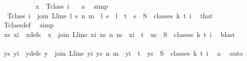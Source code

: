 \begin{isabellebody}
\ \ \ \ \ \ \isamarkupfalse%
\ \isamarkupfalse%
\ \ {\isachardoublequoteopen}x\ {\isasymin}\ T{\isacharunderscore}{\kern0pt}class\ i\ {\isachardoublequoteclose}\ \isamarkupfalse%
\ a\ \isamarkupfalse%
\ simp\isanewline
\ \ \ \ \ \ \isamarkupfalse%
\ \isamarkupfalse%
\ {\isacharasterisk}{\kern0pt}{\isacharasterisk}{\kern0pt}{\isacharcolon}{\kern0pt}\ {\isachardoublequoteopen}T{\isacharunderscore}{\kern0pt}class\ i\ {\isacharequal}{\kern0pt}\ {\isacharbraceleft}{\kern0pt}join\ {\isacharparenleft}{\kern0pt}L{\isacharunderscore}{\kern0pt}line\ l{\isacharparenright}{\kern0pt}\ s\ n\ m\ {\isacharbar}{\kern0pt}\ l\ s\ {\isachardot}{\kern0pt}\ l\ {\isasymin}\ {\isacharbraceleft}{\kern0pt}{\isachardot}{\kern0pt}{\isachardot}{\kern0pt}{\isacharless}{\kern0pt}t{\isacharbraceright}{\kern0pt}\ {\isasymand}\ s\ {\isasymin}\ S\ {\isacharbackquote}{\kern0pt}\ {\isacharparenleft}{\kern0pt}classes\ k\ t\ i{\isacharparenright}{\kern0pt}{\isacharbraceright}{\kern0pt}{\isachardoublequoteclose}\ \isamarkupfalse%
\ that\ \isamarkupfalse%
\ T{\isacharunderscore}{\kern0pt}class{\isacharunderscore}{\kern0pt}def\ \isamarkupfalse%
\ simp\isanewline
\ \ \ \ \ \ \isamarkupfalse%
\ \isamarkupfalse%
\ xs\ xi\ \ xdefs{\isacharcolon}{\kern0pt}\ \ {\isachardoublequoteopen}x\ {\isacharequal}{\kern0pt}\ join\ {\isacharparenleft}{\kern0pt}L{\isacharunderscore}{\kern0pt}line\ xi{\isacharparenright}{\kern0pt}\ xs\ n\ m\ {\isasymand}\ xi\ {\isacharless}{\kern0pt}\ t\ {\isasymand}\ xs\ {\isasymin}\ S\ {\isacharbackquote}{\kern0pt}\ {\isacharparenleft}{\kern0pt}classes\ k\ t\ i{\isacharparenright}{\kern0pt}{\isachardoublequoteclose}\ \isamarkupfalse%
\ blast\isanewline
\isanewline
\ \ \ \ \ \ \isamarkupfalse%
\ {\isacharasterisk}{\kern0pt}\ {\isacharasterisk}{\kern0pt}{\isacharasterisk}{\kern0pt}\ \isamarkupfalse%
\ ys\ yi\ \ ydefs{\isacharcolon}{\kern0pt}\ {\isachardoublequoteopen}y\ {\isacharequal}{\kern0pt}\ join\ {\isacharparenleft}{\kern0pt}L{\isacharunderscore}{\kern0pt}line\ yi{\isacharparenright}{\kern0pt}\ ys\ n\ m\ {\isasymand}\ yi\ {\isacharless}{\kern0pt}\ t\ {\isasymand}\ ys\ {\isasymin}\ S\ {\isacharbackquote}{\kern0pt}\ {\isacharparenleft}{\kern0pt}classes\ k\ t\ i{\isacharparenright}{\kern0pt}{\isachardoublequoteclose}\ \isamarkupfalse%
\ a\ \isamarkupfalse%
\ auto\isanewline

\end{isabellebody}
